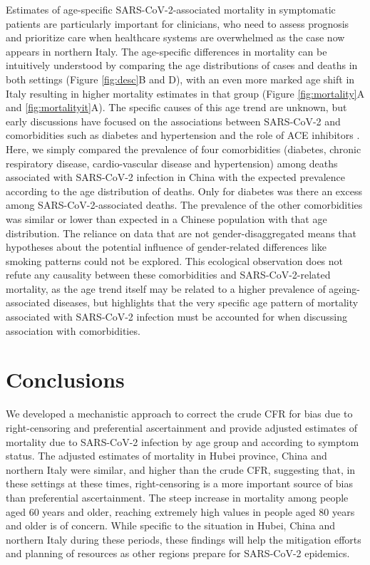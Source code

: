 \documentclass{article}
\begin{document}
Estimates of age-specific SARS-CoV-2-associated mortality in symptomatic patients are particularly important for clinicians, who need to assess prognosis and prioritize care when healthcare systems are overwhelmed as the case now appears in northern Italy. 
The age-specific differences in mortality can be intuitively understood by comparing the age distributions of cases and deaths in both settings (Figure \ref{fig:desc}B and D), with an even more marked age shift in Italy resulting in higher mortality estimates in that group (Figure \ref{fig:mortality}A and \ref{fig:mortalityit}A). The specific causes of this age trend are unknown, but early discussions have focused on the associations between SARS-CoV-2 and comorbidities such as diabetes and hypertension and the role of ACE inhibitors \cite{fang2020patients}. Here, we simply compared the prevalence of four comorbidities (diabetes, chronic respiratory disease, cardio-vascular disease and hypertension) among deaths associated with SARS-CoV-2 infection in China with the expected prevalence according to the age distribution of deaths. Only for diabetes was there an excess among SARS-CoV-2-associated deaths. The prevalence of the other comorbidities was similar or lower than expected in a Chinese population with that age distribution. The reliance on data that are not gender-disaggregated means that hypotheses about the potential influence of gender-related differences like smoking patterns could not be explored. This ecological observation does not refute any causality between these comorbidities and SARS-CoV-2-related mortality, as the age trend itself may be related to a higher prevalence of ageing-associated diseases, but highlights that the very specific age pattern of mortality associated with SARS-CoV-2 infection must be accounted for when discussing association with comorbidities.

\section*{Conclusions}

We developed a mechanistic approach to correct the crude CFR for bias due to right-censoring and preferential ascertainment and provide adjusted estimates of mortality due to SARS-CoV-2 infection by age group and according to symptom status. The adjusted estimates of mortality in Hubei province, China and northern Italy were similar, and higher than the crude CFR, suggesting that, in these settings at these times, right-censoring is a more important source of bias than preferential ascertainment. The steep increase in mortality among people aged 60 years and older, reaching extremely high values in people aged 80 years and older is of concern. 
While specific to the situation in Hubei, China and northern Italy during these periods, these findings will help the mitigation efforts and planning of resources as other regions prepare for SARS-CoV-2 epidemics.
\end{document}
